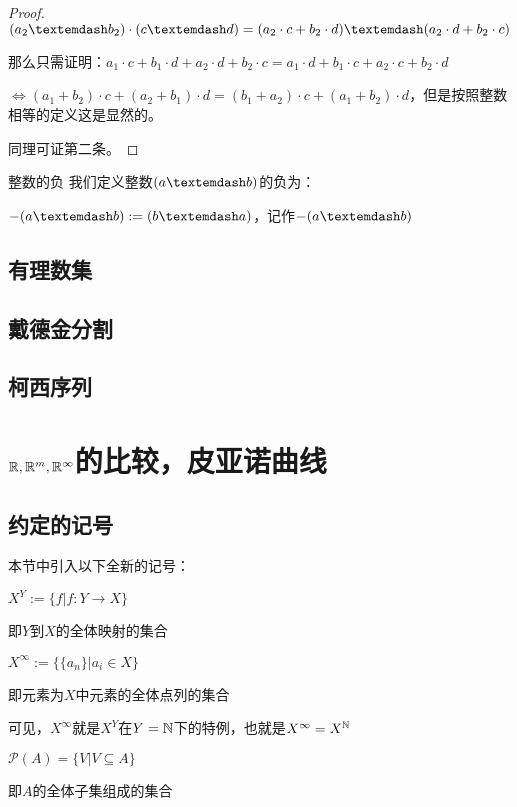 \documentclass[12pt, a4paper, oneside, UTF8]{ctexbook}
\begin{document}
\begin{para}{0}
\begin{proof}
						$(a_2 \textemdash b_2)\cdot (c\textemdash d)=(a_2\cdot c+b_2\cdot d)\textemdash (a_2\cdot d+b_2\cdot c)$
						
						那么只需证明：$a_1 \cdot c+b_1\cdot d+a_2\cdot d+b_2\cdot c=a_1\cdot d+b_1\cdot c+a_2\cdot c+b_2\cdot d$
						
						$\Leftrightarrow (a_1+b_2)\cdot c + (a_2+b_1)\cdot d = (b_1+a_2)\cdot c+(a_1+b_2)\cdot d$，但是按照整数相等的定义这是显然的。
						
						同理可证第二条。
					\end{proof}
					\begin{defn}{整数的负}{}
						我们定义整数$(a \textemdash b)$的负为：
						
						$-(a\textemdash b) := (b\textemdash a)$，记作$-(a\textemdash b)$
					\end{defn}
			\end{para}
		\subsection{有理数集}
		\subsection{戴德金分割}
		\subsection{柯西序列}
	\section{\texorpdfstring{$\mathbb{R},\mathbb{R}^m,\mathbb{R}^\infty$}势的比较，皮亚诺曲线}
		\subsection{约定的记号}
			本节中引入以下全新的记号：
			\begin{para}{0}
					\begin{defn}{}{}
						$X^Y := \{f| f:Y \rightarrow X\}$
						
						即$Y$到$X$的全体映射的集合
					\end{defn}
					\begin{defn}{}{}
						$X^\infty := \{\{a_n\}| a_i\in X\}$
						
						即元素为$X$中元素的全体点列的集合
					\end{defn}
					可见，$X^\infty$就是$X^Y$在$Y=\mathbb{N}$下的特例，也就是$X^{\infty}=X^{\mathbb{N}}$
					\begin{defn}{}{}
						$\mathscr{P}(A) = \{V|V \subseteq A\}$
						
						即$A$的全体子集组成的集合
					\end{defn}
			\end{para}
			
\end{document}
